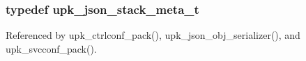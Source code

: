 \subsubsection[{upk\_\-json\_\-stack\_\-meta\_\-t}]{\setlength{\rightskip}{0pt plus 5cm}typedef {\bf upk\_\-json\_\-stack\_\-meta\_\-t}}\label{upk__json_8h_aff609f6fce8f333fcdbe7a130c7c33b8}


Referenced by upk\_\-ctrlconf\_\-pack(), upk\_\-json\_\-obj\_\-serializer(), and upk\_\-svcconf\_\-pack().

